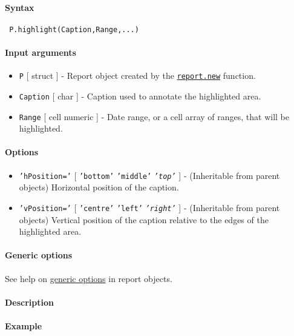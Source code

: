 


	\paragraph{Syntax}
 
 \begin{verbatim}
 P.highlight(Caption,Range,...)
 \end{verbatim}
 
 \paragraph{Input arguments}
 
 \begin{itemize}
 \item
   \texttt{P} {[} struct {]} - Report object created by the
   \href{report/new}{\texttt{report.new}} function.
 \item
   \texttt{Caption} {[} char {]} - Caption used to annotate the
   highlighted area.
 \item
   \texttt{Range} {[} cell \textbar{} numeric {]} - Date range, or a cell
   array of ranges, that will be highlighted.
 \end{itemize}
 
 \paragraph{Options}
 
 \begin{itemize}
 \item
   \texttt{'hPosition='} {[} \texttt{'bottom'} \textbar{}
   \texttt{'middle'} \textbar{} \emph{\texttt{'top'}} {]} - (Inheritable
   from parent objects) Horizontal position of the caption.
 \item
   \texttt{'vPosition='} {[} \texttt{'centre'} \textbar{} \texttt{'left'}
   \textbar{} \emph{\texttt{'right'}} {]} - (Inheritable from parent
   objects) Vertical position of the caption relative to the edges of the
   highlighted area.
 \end{itemize}
 
 \paragraph{Generic options}
 
 See help on \href{report/Contents}{generic options} in report objects.
 
 \paragraph{Description}
 
 \paragraph{Example}


